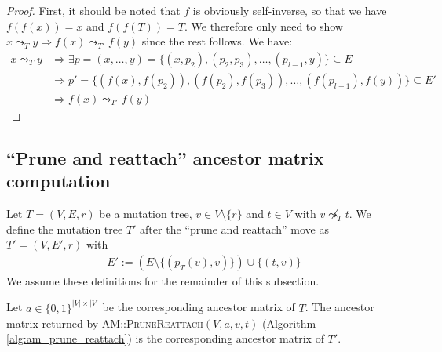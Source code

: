 \begin{proof}
    First, it should be noted that $f$ is obviously self-inverse, so that we have $f(f(x)) = x$ and $f(f(T)) = T$. We therefore only need to show $x \leadsto_{T} y \Rightarrow f(x) \leadsto_{T'} f(y)$ since the rest follows. We have:
    \begin{align*}
        x \leadsto_T y &\Rightarrow \exists p = (x, \dots, y) = \{(x, p_2), (p_2, p_3), \dots, (p_{l-1}, y)\} \subseteq E \\
        &\Rightarrow p' = \{(f(x), f(p_2)), (f(p_2), f(p_3)), \dots, (f(p_{l-1}), f(y))\} \subseteq E' \\
        &\Rightarrow f(x) \leadsto_{T'} f(y)
    \end{align*}
\end{proof}

\subsection{``Prune and reattach'' ancestor matrix computation}

\begin{definition}
    \label{def:prune_and_reattach}
    Let $T = (V, E, r)$ be a mutation tree, $v \in V \setminus \{r\}$ and $t \in V$ with $v \not\leadsto_T t$. We define the mutation tree $T'$ after the ``prune and reattach'' move as $T' = (V, E', r)$ with
    \begin{align*}
        E' := (E \setminus \{(p_T(v), v)\}) \cup \{(t, v)\}
    \end{align*}
    We assume these definitions for the remainder of this subsection.
\end{definition}

\begin{theorem}
    \label{theo:prune_reattach_correctness}
    Let $a \in \{0,1\}^{|V| \times |V|}$ be the corresponding ancestor matrix of $T$. The ancestor matrix returned by \textsc{AM::Prune\-Reattach}\-$(V, a, v, t)$ (Algorithm \ref{alg:am_prune_reattach}) is the corresponding ancestor matrix of $T'$.
\end{theorem}

